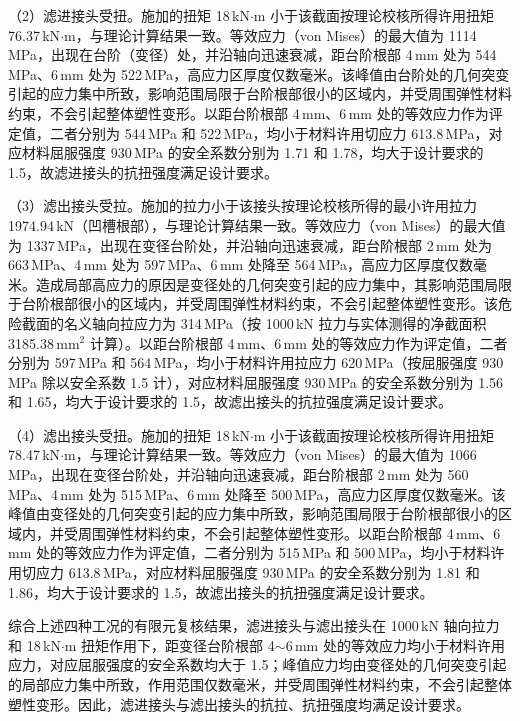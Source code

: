 （2）滤进接头受扭。施加的扭矩 18\,kN$\cdot$m 小于该截面按理论校核所得许用扭矩 76.37\,kN$\cdot$m，与理论计算结果一致。等效应力（von Mises）的最大值为 1114\,MPa，出现在台阶（变径）处，并沿轴向迅速衰减，距台阶根部 4\,mm 处为 544\,MPa、6\,mm 处为 522\,MPa，高应力区厚度仅数毫米。该峰值由台阶处的几何突变引起的应力集中所致，影响范围局限于台阶根部很小的区域内，并受周围弹性材料约束，不会引起整体塑性变形。以距台阶根部 4\,mm、6\,mm 处的等效应力作为评定值，二者分别为 544\,MPa 和 522\,MPa，均小于材料许用切应力 613.8\,MPa，对应材料屈服强度 930\,MPa 的安全系数分别为 1.71 和 1.78，均大于设计要求的 1.5，故滤进接头的抗扭强度满足设计要求。

（3）滤出接头受拉。施加的拉力小于该接头按理论校核所得的最小许用拉力 1974.94\,kN（凹槽根部），与理论计算结果一致。等效应力（von Mises）的最大值为 1337\,MPa，出现在变径台阶处，并沿轴向迅速衰减，距台阶根部 2\,mm 处为 663\,MPa、4\,mm 处为 597\,MPa、6\,mm 处降至 564\,MPa，高应力区厚度仅数毫米。造成局部高应力的原因是变径处的几何突变引起的应力集中，其影响范围局限于台阶根部很小的区域内，并受周围弹性材料约束，不会引起整体塑性变形。该危险截面的名义轴向拉应力为 314\,MPa（按 1000\,kN 拉力与实体测得的净截面积 3185.38\,mm$^{2}$ 计算）。以距台阶根部 4\,mm、6\,mm 处的等效应力作为评定值，二者分别为 597\,MPa 和 564\,MPa，均小于材料许用拉应力 620\,MPa（按屈服强度 930\,MPa 除以安全系数 1.5 计），对应材料屈服强度 930\,MPa 的安全系数分别为 1.56 和 1.65，均大于设计要求的 1.5，故滤出接头的抗拉强度满足设计要求。

（4）滤出接头受扭。施加的扭矩 18\,kN$\cdot$m 小于该截面按理论校核所得许用扭矩 78.47\,kN$\cdot$m，与理论计算结果一致。等效应力（von Mises）的最大值为 1066\,MPa，出现在变径台阶处，并沿轴向迅速衰减，距台阶根部 2\,mm 处为 560\,MPa、4\,mm 处为 515\,MPa、6\,mm 处降至 500\,MPa，高应力区厚度仅数毫米。该峰值由变径处的几何突变引起的应力集中所致，影响范围局限于台阶根部很小的区域内，并受周围弹性材料约束，不会引起整体塑性变形。以距台阶根部 4\,mm、6\,mm 处的等效应力作为评定值，二者分别为 515\,MPa 和 500\,MPa，均小于材料许用切应力 613.8\,MPa，对应材料屈服强度 930\,MPa 的安全系数分别为 1.81 和 1.86，均大于设计要求的 1.5，故滤出接头的抗扭强度满足设计要求。

综合上述四种工况的有限元复核结果，滤进接头与滤出接头在 1000\,kN 轴向拉力和 18\,kN$\cdot$m 扭矩作用下，距变径台阶根部 4$\sim$6\,mm 处的等效应力均小于材料许用应力，对应屈服强度的安全系数均大于 1.5；峰值应力均由变径处的几何突变引起的局部应力集中所致，作用范围仅数毫米，并受周围弹性材料约束，不会引起整体塑性变形。因此，滤进接头与滤出接头的抗拉、抗扭强度均满足设计要求。

